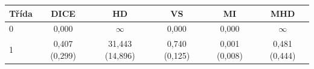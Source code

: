 \begin{tabular}{l c c c c c}
 \hline
Třída & DICE & HD & VS & MI & MHD \\ \hline
0 & 0,000 & $\infty$ & 0,000 & 0,000 & $\infty$ \\
1 & 0,407 (0,299) & 31,443 (14,896) & 0,740 (0,125) & 0,001 (0,008) & 0,481 (0,444) \\
\hline 
 \end{tabular}
